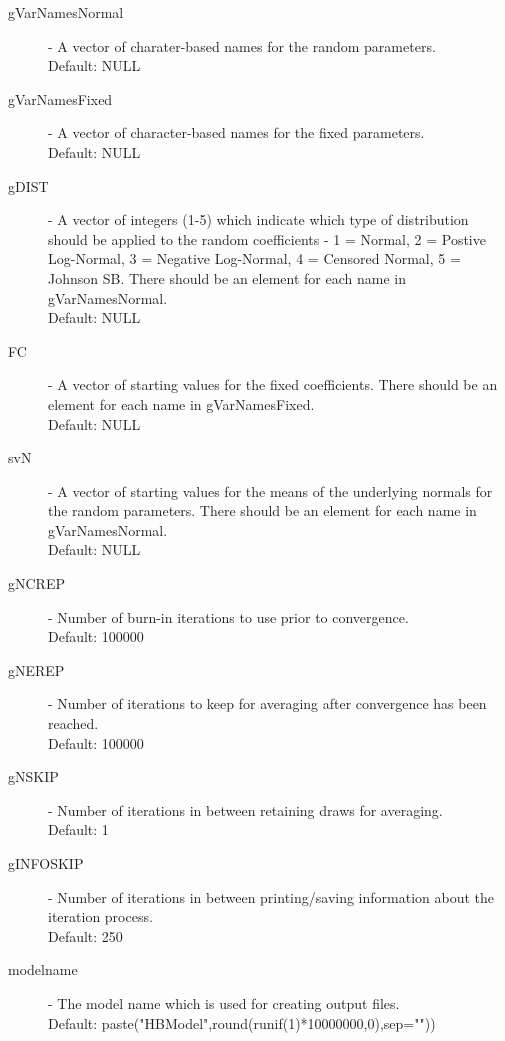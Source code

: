 \documentclass{article}\usepackage{graphicx, color}
\begin{document}
\begin{description}

\item[gVarNamesNormal] - A vector of charater-based names for the random parameters. \\
Default: NULL

\item[gVarNamesFixed] - A vector of character-based names for the fixed parameters.\\
Default: NULL

\item[gDIST] - A vector of integers (1-5) which indicate which type of distribution should be applied to the random coefficients - 1 = Normal, 2 = Postive Log-Normal, 3 = Negative Log-Normal, 4 = Censored Normal, 5 = Johnson SB. There should be an element for each name in gVarNamesNormal. \\ Default: NULL

\item[FC] - A vector of starting values for the fixed coefficients. There should be an element for each name in gVarNamesFixed.\\ 
Default: NULL

\item[svN] - A vector of starting values for the means of the underlying normals for the random parameters. There should be an element for each name in gVarNamesNormal.\\ Default: NULL

\item[gNCREP] - Number of burn-in iterations to use prior to convergence.\\ 
Default: 100000

\item[gNEREP] - Number of iterations to keep for averaging after convergence has been reached.\\ Default: 100000

\item[gNSKIP] - Number of iterations in between retaining draws for averaging.\\ 
Default: 1

\item[gINFOSKIP] - Number of iterations in between printing/saving information about the iteration process.
\\ Default: 250

\item[modelname] - The model name which is used for creating output files. 
\\ Default: paste("HBModel",round(runif(1)*10000000,0),sep=""))


\end{description}
\end{document}
